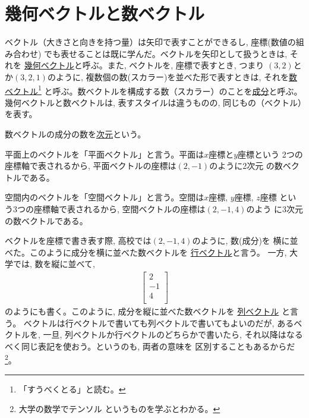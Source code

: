 \section{幾何ベクトルと数ベクトル}

ベクトル（大きさと向きを持つ量）は矢印で表すことができるし, 座標(数値の組み合わせ)
でも表せることは既に学んだ。ベクトルを矢印として扱うときは, それを
\underline{幾何ベクトル}と呼ぶ。また, ベクトルを, 座標で表すとき, つまり
$(3, 2)$とか$(3, 2, 1)$のように, 複数個の数(スカラー)を並べた形で表すときは, 
それを\underline{数ベクトル}\footnote{「すうべくとる」と読む。}
と呼ぶ。数ベクトルを構成する数（スカラー）のことを\underline{成分}と呼ぶ。
幾何ベクトルと数ベクトルは, 表すスタイルは違うものの, 同じもの（ベクトル）を表す。

数ベクトルの成分の数を\underline{次元}という。

平面上のベクトルを「平面ベクトル」と言う。平面は$x$座標と$y$座標という
2つの座標軸で表されるから, 平面ベクトルの座標は$(2, -1)$のように2次元
の数ベクトルである。

空間内のベクトルを「空間ベクトル」と言う。空間は$x$座標, $y$座標, $z$座標
という3つの座標軸で表されるから, 空間ベクトルの座標は$(2, -1, 4)$のよう
に3次元の数ベクトルである。\hv

ベクトルを座標で書き表す際, 高校では$(2, -1, 4)$のように, 数(成分)を
横に並べた。このように成分を横に並べた数ベクトルを
\underline{行ベクトル}と言う。
一方, 大学では, 数を縦に並べて, 
\begin{eqnarray}
\begin{bmatrix}
2 \\
-1 \\
4\\
\end{bmatrix}
\end{eqnarray}
のようにも書く。このように, 成分を縦に並べた数ベクトルを
\underline{列ベクトル} と言う。
ベクトルは行ベクトルで書いても列ベクトルで書いてもよいのだが, 
あるベクトルを, 一旦, 列ベクトルか行ベクトルのどちらかで書いたら, 
それ以降はなるべく同じ表記を使おう。というのも, 両者の意味を
区別することもあるからだ\footnote{大学の数学でテンソル
というものを学ぶとわかる。}。

